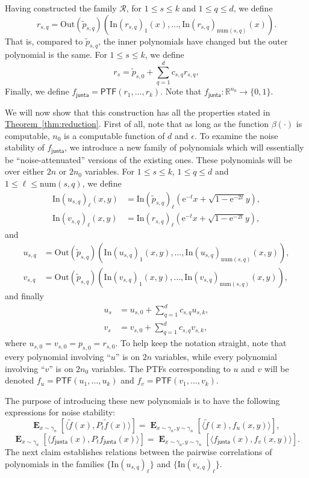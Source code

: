 \documentclass[11pt]{article}
\numberwithin{equation}{section}
\theoremstyle{definition}
\theoremstyle{plain}
\newcommand{\eee}{\mathrm e}
\newcommand{\expref}[2]{\hyperref[#2]{#1~\ref{#2}}}
\newcommand{\Inner}{\mathrm{In}}
\newcommand{\Outer}{\mathrm{Out}}
\newcommand{\num}{\mathrm{num}}
\newcommand{\fh}{{f_{\mathsf{junta}}}}
\begin{document}
Having constructed the family $\mathcal{R}$, for $1 \le s \le k$ and $1 \le q \le d$, we define
\[
r_{s,q} =\Outer(\tilde p_{s,q}) \left(\Inner(r_{s,q})_1(x),\dots, \Inner(r_{s,q})_{\num({s,q})}(x)\right).
\]
That is, compared to $\tilde p_{s,q}$, the inner polynomials have changed but the outer polynomial is the same.
For $1 \le s \le k$, we define
\[
    r_s =  \tilde p_{s,0} + \sum_{q=1}^d c_{s,q} r_{s,q},
\]
Finally, we define $\fh = \mathsf{PTF}({r}_1, \ldots, {r}_k)$. Note that $\fh: \mathbb{R}^{n_0} \rightarrow \{0,1\}$.

We will now show that this construction has all the properties stated in \expref{Theorem}{thm:reduction}. 
First of all, note that as long as the function $\beta(\cdot)$ is computable, $n_0$ is a computable function of $d$ and $\epsilon$.
To examine the noise stability of $\fh$, we introduce
a new family of polynomials which will essentially be
``noise-attenuated'' versions of the existing ones. These polynomials will be over
either $2n$ or $2n_0$ variables.
For $1 \le s \le k$, $1 \le q \le d$ and $1 \le \ell \le \num(s,q)$, we define 
\begin{align*}
    \Inner(u_{s,q})_\ell(x,y) &= \Inner(\tilde p_{s,q})_\ell(\eee^{-t}x + \sqrt{1 - \eee^{-2t}}y), \\
    \Inner(v_{s,q})_\ell(x,y) &= \Inner(r_{s,q})_\ell(\eee^{-t}x + \sqrt{1 - \eee^{-2t}}y),
\end{align*}
and
\begin{align*}
    u_{s,q} &= \Outer(\tilde p_{s,q}) \left(\Inner(u_{s,q})_1(x,y),\dots, \Inner(u_{s,q})_{\num({s,q})}(x,y)\right), \\
    v_{s,q} &=\Outer(\tilde p_{s,q}) \left(\Inner(v_{s,q})_1(x,y),\dots, \Inner(v_{s,q})_{\num({s,q})}(x,y)\right),
\end{align*}
and finally
\begin{align*}
    u_s &= u_{s,0} + \sum_{q=1}^d c_{s,q} u_{s,k}, \\
    v_s &= v_{s,0} + \sum_{q=1}^d c_{s,q} v_{s,k},
\end{align*}
where $u_{s,0} = v_{s,0} = p_{s,0}= r_{s,0}$.
To help keep the notation straight, note that every polynomial involving
``$u$'' is on $2n$ variables, while every polynomial involving ``$v$'' is on $2
n_0$ variables. The PTFs corresponding to $u$ and $v$ will be denoted
$f_u = \mathsf{PTF}(u_1,\dots, u_k)$ and $f_v = \mathsf{PTF}(v_1, \dots, v_k)$.

The purpose of introducing these new polynomials is to have the following expressions
for noise stability:
$$
\mathop{\mathbf{E}}_{x \sim \gamma_n} [\langle \tilde{f}(x) , P_{t} \tilde{f}(x) \rangle] = \mathop{\mathbf{E}}_{x \sim \gamma_n, y \sim \gamma_n}[\langle \tilde{f}(x), f_u(x,y) \rangle], \ 
$$ 
$$
\mathop{\mathbf{E}}_{x \sim \gamma_n} [\langle \fh(x) , P_{t} \fh(x)\rangle] = \mathop{\mathbf{E}}_{x \sim \gamma_n, y \sim \gamma_n}[\langle \fh(x), f_v(x,y) \rangle].
$$
The next claim establishes relations between the pairwise correlations of polynomials in the families
$\{\Inner(u_{s,q})_\ell\}$ and $\{\Inner(v_{s,q})_\ell\}$. 
\end{document}
